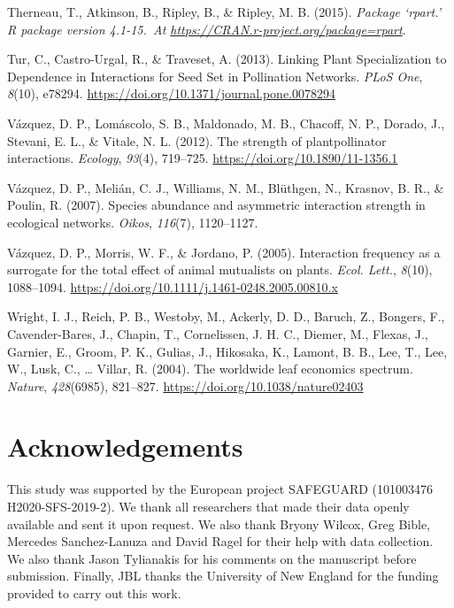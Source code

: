 \documentclass[
  12pt,
  a4paper,
]{article}
\newlength{\cslhangindent}
\newlength{\cslentryspacingunit} %
\newenvironment{CSLReferences}[2] %
 {%
  \setlength{\parindent}{0pt}
  \ifodd #1
  \let\oldpar\par
  \def\par{\hangindent=\cslhangindent\oldpar}
  \fi
  \setlength{\parskip}{#2\cslentryspacingunit}
 }%
 {}
\begin{document}
\begin{CSLReferences}{1}{0}
\leavevmode{}%
Therneau, T., Atkinson, B., Ripley, B., \& Ripley, M. B. (2015). \emph{Package {`rpart.'} R package version 4.1-15.~At \href{https://CRAN.R-project.org/package=rpart}{https://CRAN.r-project.org/package=rpart}}.

\leavevmode{}%
Tur, C., Castro-Urgal, R., \& Traveset, A. (2013). Linking {Plant Specialization} to {Dependence} in {Interactions} for {Seed Set} in {Pollination Networks}. \emph{PLoS One}, \emph{8}(10), e78294. \url{https://doi.org/10.1371/journal.pone.0078294}

\leavevmode{}%
Vázquez, D. P., Lomáscolo, S. B., Maldonado, M. B., Chacoff, N. P., Dorado, J., Stevani, E. L., \& Vitale, N. L. (2012). The strength of plant\textendash pollinator interactions. \emph{Ecology}, \emph{93}(4), 719--725. \url{https://doi.org/10.1890/11-1356.1}

\leavevmode{}%
Vázquez, D. P., Melián, C. J., Williams, N. M., Blüthgen, N., Krasnov, B. R., \& Poulin, R. (2007). Species abundance and asymmetric interaction strength in ecological networks. \emph{Oikos}, \emph{116}(7), 1120--1127.

\leavevmode{}%
Vázquez, D. P., Morris, W. F., \& Jordano, P. (2005). Interaction frequency as a surrogate for the total effect of animal mutualists on plants. \emph{Ecol. Lett.}, \emph{8}(10), 1088--1094. \url{https://doi.org/10.1111/j.1461-0248.2005.00810.x}

\leavevmode{}%
Wright, I. J., Reich, P. B., Westoby, M., Ackerly, D. D., Baruch, Z., Bongers, F., Cavender-Bares, J., Chapin, T., Cornelissen, J. H. C., Diemer, M., Flexas, J., Garnier, E., Groom, P. K., Gulias, J., Hikosaka, K., Lamont, B. B., Lee, T., Lee, W., Lusk, C., \ldots{} Villar, R. (2004). The worldwide leaf economics spectrum. \emph{Nature}, \emph{428}(6985), 821--827. \url{https://doi.org/10.1038/nature02403}

\end{CSLReferences}

\hypertarget{acknowledgements}{%
\section{Acknowledgements}\label{acknowledgements}}

This study was supported by the European project SAFEGUARD (101003476 H2020-SFS-2019-2). We thank all researchers that made their data openly available and sent it upon request. We also thank Bryony Wilcox, Greg Bible, Mercedes Sanchez-Lanuza and David Ragel for their help with data collection. We also thank Jason Tylianakis for his comments on the manuscript before submission. Finally, JBL thanks the University of New England for the funding provided to carry out this work.
\end{document}
